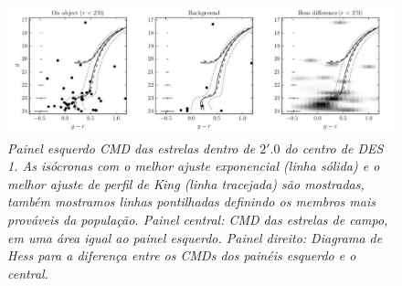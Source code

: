 \documentclass[
	12pt,				%
	openany,			%
	oneside,			%
	a4paper,			%
	english,			%
	brazil				%
	]{abntex2}
\begin{document}
\begin{figure}[h]
\begin{center}
\includegraphics[width=16cm]{figuras/isodes1.pdf}
\caption{\textit{Painel esquerdo CMD das estrelas dentro de $2'.0$ do centro de DES 1. As isócronas com o melhor ajuste exponencial (linha sólida) e o melhor ajuste de perfil de King (linha tracejada) são mostradas, também mostramos linhas pontilhadas definindo os  membros mais prováveis  da população. Painel central: CMD das estrelas de campo, em uma área igual ao painel esquerdo. Painel direito: Diagrama de Hess para a diferença entre os CMDs dos painéis esquerdo e o central.}}
\label{fig:isodes1}
\end{center}
\end{figure}
\vspace{0.5cm}





\end{document}
